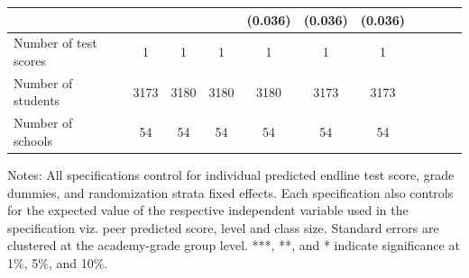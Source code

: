\begin{center}
\begin{scriptsize}
\begin{threeparttable}
\begin{tabular} {@{} l l c c c c c c c c c c  @{}}
                 &  &  &  &  & (0.036) & (0.036) & (0.036) \\
\midrule
Number of test scores &  & 1 & 1 & 1 & 1 & 1 & 1 \\
Number of students &  & 3173 & 3180 & 3180 & 3180 & 3173 & 3173 \\
Number of schools &  & 54 & 54 & 54 & 54 & 54 & 54 \\
\bottomrule
\end{tabular}
\begin{tablenotes}
\item Notes: All specifications control for individual predicted endline test score, grade dummies, and randomization strata fixed effects. Each specification also controls for the expected value of the respective independent variable used in the specification viz. peer predicted score, level and class size. Standard errors are clustered at the academy-grade group level. ***, **, and * indicate significance at 1\%, 5\%, and 10\%.\end{tablenotes}
\end{threeparttable}
\end{scriptsize}
\end{center}
\clearpage
